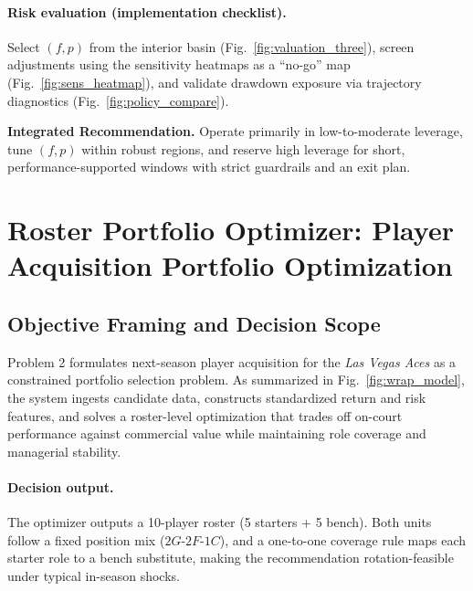 \documentclass[12pt]{article}
\numberwithin{figure}{section}
\numberwithin{table}{section}
\begin{document}
	\paragraph{Risk evaluation (implementation checklist).}
	Select $(f,p)$ from the interior basin (Fig.~\ref{fig:valuation_three}), screen adjustments using the sensitivity heatmaps as a ``no-go'' map (Fig.~\ref{fig:sens_heatmap}), and validate drawdown exposure via trajectory diagnostics (Fig.~\ref{fig:policy_compare}). 
	
	\noindent\textbf{Integrated Recommendation.} Operate primarily in low-to-moderate leverage, tune $(f,p)$ within robust regions, and reserve high leverage for short, performance-supported windows with strict guardrails and an exit plan.
	
	
	
	
	\section{Roster Portfolio Optimizer: Player Acquisition Portfolio Optimization}
	
	\subsection{Objective Framing and Decision Scope}
	

	
	Problem 2 formulates next-season player acquisition for the \textit{Las Vegas Aces} as a constrained portfolio selection problem. As summarized in Fig.~\ref{fig:wrap_model}, the system ingests candidate data, constructs standardized return and risk features, and solves a roster-level optimization that trades off on-court performance against commercial value while maintaining role coverage and managerial stability.
	

	
	\paragraph{Decision output.}
	The optimizer outputs a 10-player roster (5 starters + 5 bench). Both units follow a fixed position mix ($2G$-$2F$-$1C$), and a one-to-one coverage rule maps each starter role to a bench substitute, making the recommendation rotation-feasible under typical in-season shocks.
	
\end{document}
